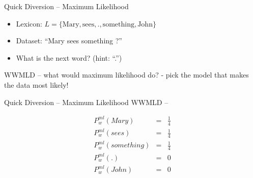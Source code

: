 \documentclass[11pt]{beamer}
\begin{document}
	\begin{frame}{Quick Diversion -- Maximum Likelihood}
		\begin{itemize}
			\item Lexicon: $L = \lbrace \text{Mary}, \text{sees}, \text{.}, \text{something}, \text{John}  \rbrace$
			\item Dataset: ``Mary sees something ?''
			\item What is the next word? (hint: ``.'')
		\end{itemize}
		
		WWMLD -- what would maximum likelihood do? - pick the model that makes the data most likely!
	\end{frame}
	
	\begin{frame}{Quick Diversion -- Maximum Likelihood}
		WWMLD --
		
		\begin{align*}
			P^{ml}_{w}(Mary) & = & \frac{1}{4}\\
			P^{ml}_{w}(sees) & = & \frac{1}{4}\\
			P^{ml}_{w}(something) & = & \frac{1}{4}\\
			P^{ml}_{w}(.) & = & 0 \\
			P^{ml}_{w}(John) & = & 0\\
		\end{align*}		
	\end{frame}
	
\end{document}
